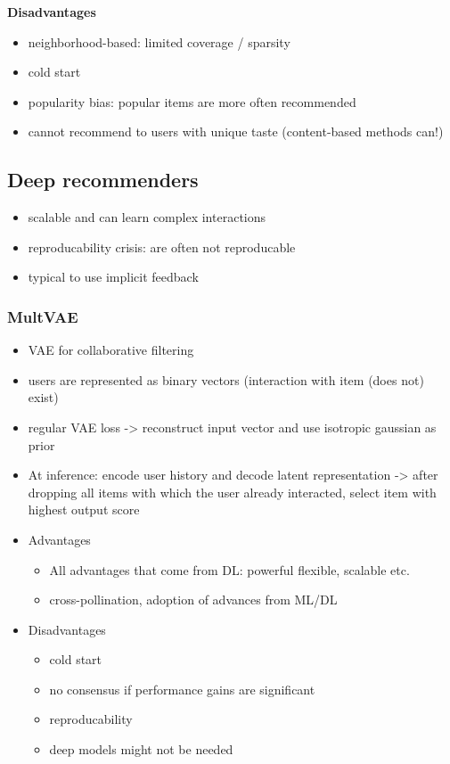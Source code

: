\textbf{Disadvantages}
\begin{itemize}
    \item neighborhood-based: limited coverage / sparsity
    \item cold start
    \item popularity bias: popular items are more often recommended
    \item cannot recommend to users with unique taste (content-based methods can!)
\end{itemize}
\subsection{Deep recommenders}
\begin{itemize}
    \item scalable and can learn complex interactions
    \item reproducability crisis: are often not reproducable
    \item typical to use implicit feedback
\end{itemize}
\subsubsection{MultVAE}
\begin{itemize}
    \item VAE for collaborative filtering
    \item users are represented as binary vectors (interaction with item (does not) exist)
    \item regular VAE loss -> reconstruct input vector and use isotropic gaussian as prior
    \item At inference: encode user history and decode latent representation -> after dropping all items with which the user already interacted, select item with highest output score
    \item Advantages
    \begin{itemize}
        \item All advantages that come from DL: powerful flexible, scalable etc.
        \item cross-pollination, adoption of advances from ML/DL
    \end{itemize}
    \item Disadvantages
    \begin{itemize}
        \item cold start
        \item no consensus if performance gains are significant
        \item reproducability
        \item deep models might not be needed
    \end{itemize}
\end{itemize}

